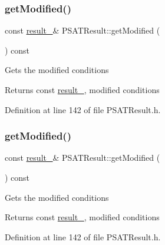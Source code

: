 \subsubsection{\texorpdfstring{get\+Modified()}{getModified()}\hspace{0.1cm}{\footnotesize\ttfamily [2/3]}}
{\footnotesize\ttfamily const \hyperlink{struct_p_s_a_t_result_1_1result__}{result\+\_\+}\& P\+S\+A\+T\+Result\+::get\+Modified (\begin{DoxyParamCaption}{ }\end{DoxyParamCaption}) const\hspace{0.3cm}{\ttfamily [inline]}}

Gets the modified conditions

\begin{DoxyReturn}{Returns}
const \hyperlink{struct_p_s_a_t_result_1_1result__}{result\+\_\+}, modified conditions 
\end{DoxyReturn}


Definition at line 142 of file P\+S\+A\+T\+Result.\+h.

\mbox{\label{class_p_s_a_t_result_ae43bb3b001e2746292d0dd0d6cebcfdd}} 
\subsubsection{\texorpdfstring{get\+Modified()}{getModified()}\hspace{0.1cm}{\footnotesize\ttfamily [3/3]}}
{\footnotesize\ttfamily const \hyperlink{struct_p_s_a_t_result_1_1result__}{result\+\_\+}\& P\+S\+A\+T\+Result\+::get\+Modified (\begin{DoxyParamCaption}{ }\end{DoxyParamCaption}) const\hspace{0.3cm}{\ttfamily [inline]}}

Gets the modified conditions

\begin{DoxyReturn}{Returns}
const \hyperlink{struct_p_s_a_t_result_1_1result__}{result\+\_\+}, modified conditions 
\end{DoxyReturn}


Definition at line 142 of file P\+S\+A\+T\+Result.\+h.

\mbox{\label{class_p_s_a_t_result_af587235430371a05799c60e81aa8dfad}} 
